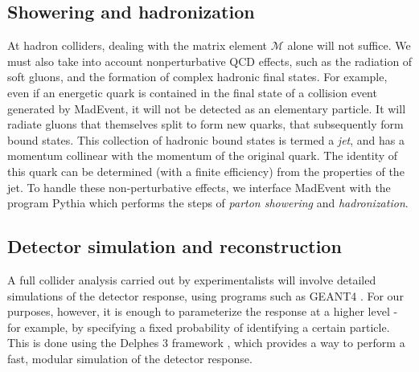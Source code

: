 \subsection{Showering and hadronization}
At hadron colliders, dealing with the matrix element $\mathcal{M}$ alone will not suffice. We must also take into account nonperturbative QCD effects, such as the radiation of soft gluons, and the formation of complex hadronic final states. For example, even if an energetic quark is contained in the final state of a collision event generated by MadEvent, it will not be detected as an elementary particle. It will radiate gluons that themselves split to form new quarks, that subsequently form bound states. This collection of hadronic bound states is termed a \emph{jet}, and has a momentum collinear with the momentum of the original quark. The identity of this quark can be determined (with a finite efficiency) from the properties of the jet. To handle these non-perturbative effects, we interface MadEvent with the program Pythia\citep{Sjostrand:2006za} which performs the steps of \emph{parton showering} and \emph{hadronization}.
\subsection{Detector simulation and reconstruction}
A full collider analysis carried out by experimentalists will involve detailed simulations of the detector response, using programs such as GEANT4 \citep{GEANT4}. For our purposes, however, it is enough to parameterize the response at a higher level - for example, by specifying a fixed probability of identifying a certain particle. This is done using the Delphes 3 framework \citep{deFavereau:2013fsa}, which provides a way to perform a fast, modular simulation of the detector response. 

